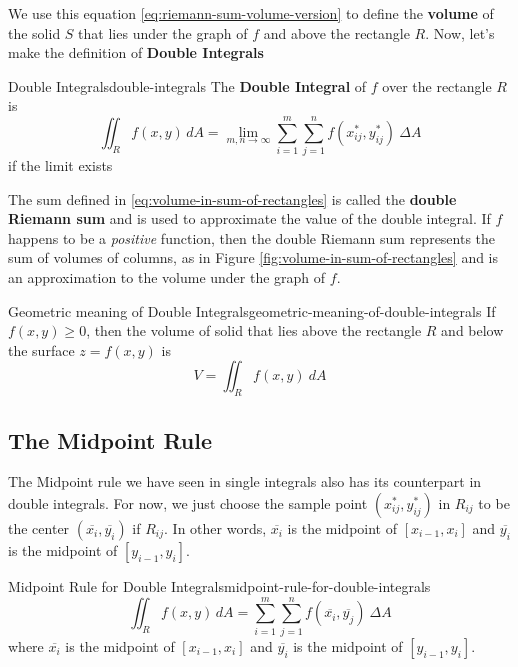 \documentclass[math,code]{amznotes}
\theoremstyle{remark}
\begin{document}
We use this equation \eqref{eq:riemann-sum-volume-version} to define the \textbf{volume} of the solid $S$ that lies under the graph of $f$ and above the rectangle $R$. Now, let's make the definition of {\color{red} \textbf{Double Integrals}}
\begin{dfnbox}{Double Integrals}{double-integrals}
    The {\color{red} \textbf{Double Integral}} of $f$ over the rectangle $R$ is
    \begin{displaymath}
        \iint_R f(x,y) \,dA = \lim\limits_{m,n \to \infty} \sum_{i=1}^{m} \sum_{j=1}^{n} f(x_{ij}^{*},y_{ij}^{*}) ~\Delta A
    \end{displaymath}
    if the limit exists
\end{dfnbox}
The sum defined in \eqref{eq:volume-in-sum-of-rectangles} is called the {\color{red} \textbf{double Riemann sum}} and is used to approximate the value of the double integral. If $f$ happens to be a \textit{positive} function, then the double Riemann sum represents the sum of volumes of columns, as in Figure \ref{fig:volume-in-sum-of-rectangles} and is an approximation to the volume under the graph of $f$.
\begin{thmbox}{Geometric meaning of Double Integrals}{geometric-meaning-of-double-integrals}
    If $f(x,y) \geq 0$, then the volume of solid that lies above the rectangle $R$ and below the surface $z=f(x,y)$ is
    \begin{displaymath}
        V = \iint_{R}f(x,y)~dA
    \end{displaymath}
\end{thmbox}
\subsection{The Midpoint Rule}
The Midpoint rule we have seen in single integrals also has its counterpart in double integrals. For now, we just choose the sample point $(x_{ij}^*, y_{ij}^*)$ in $R_{ij}$ to be the center $(\overline{x_i}, \overline{y_i})$ if $R_{ij}$. In other words, $\overline{x_i}$ is the midpoint of $[x_{i-1}, x_i]$ and $\overline{y_i}$ is the midpoint of $[y_{i-1}, y_i]$.
\begin{thmbox}{Midpoint Rule for Double Integrals}{midpoint-rule-for-double-integrals}
    \begin{displaymath}
        \iint_R f(x,y) \,dA = \sum_{i=1}^{m} \sum_{j=1}^{n} f(\overline{x_{i}},\overline{y_{j}}) ~\Delta A
    \end{displaymath}
    where $\overline{x_i}$ is the midpoint of $[x_{i-1}, x_i]$ and $\overline{y_i}$ is the midpoint of $[y_{i-1}, y_i]$.
\end{thmbox}
\end{document}
